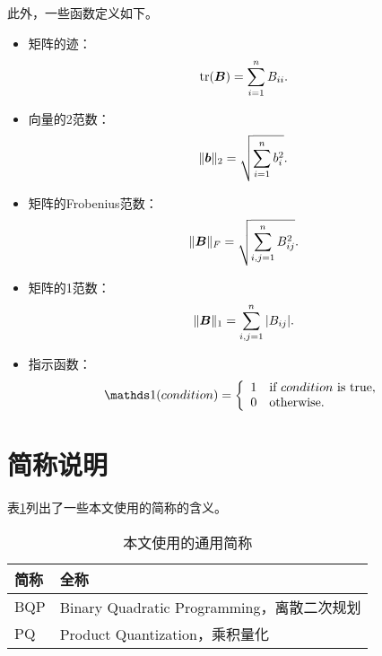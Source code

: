 此外，一些函数定义如下。
\begin{itemize}
\item 矩阵的迹：
\begin{align}
\text{tr}({\boldsymbol B})=\sum_{i=1}^nB_{ii}.\label{fun:appendix-trace}
\end{align}
\item 向量的2范数：
\begin{align}
\Vert{\boldsymbol b}\Vert_2=\sqrt{\sum_{i=1}^nb_i^2}.\label{fun:appendix-2norm}
\end{align}
\item 矩阵的Frobenius范数：
\begin{align}
\Vert{\boldsymbol B}\Vert_F=\sqrt{\sum_{i,j=1}^nB_{ij}^2}.\label{fun:appendix-Fnorm}
\end{align}
\item 矩阵的1范数：
\begin{align}
\Vert{\boldsymbol B}\Vert_1=\sum_{i,j=1}^n\vert B_{ij}\vert.\label{fun:appendix-1norm}
\end{align}
\item 指示函数：
\begin{align}
\hone(condition)=\left\{
\begin{array}{ll}
1   & \text{if } condition \text{ is true},\\
0   & \text{otherwise.}
\end{array}
\right.\label{fun:appendix-indicator}
\end{align}
\end{itemize}

\section{简称说明}
表\ref{tab:appendix-abbr}列出了一些本文使用的简称的含义。
\begin{longtable}{ll}
\caption{本文使用的通用简称}
\label{tab:appendix-abbr}
\endfirsthead
\endhead
\toprule
简称         & 全称                                                   \\\midrule
BQP         & Binary Quadratic Programming，离散二次规划               \\
PQ          & Product Quantization，乘积量化                          \\
\bottomrule
\end{longtable}

